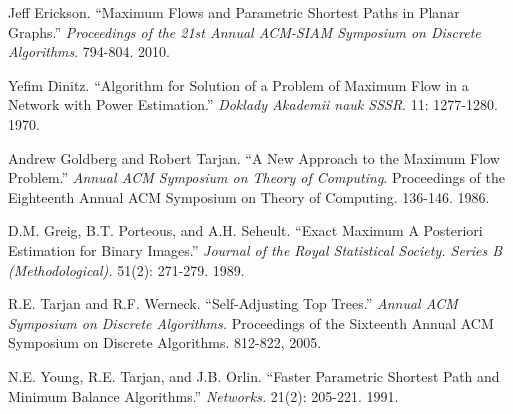 \documentclass[12pt]{article}
\begin{document}
\begin{thebibliography}{9}

        Jeff Erickson.
       ``Maximum Flows and Parametric Shortest Paths in Planar Graphs.''
       \emph{Proceedings of the 21st Annual ACM-SIAM Symposium on Discrete Algorithms}.
       794-804.
       2010.

        Yefim Dinitz.
        ``Algorithm for Solution of a Problem of Maximum Flow in a Network with Power Estimation.''
        \emph{Doklady Akademii nauk SSSR}.
        11: 1277-1280.
        1970.

        Andrew Goldberg and Robert Tarjan.
        ``A New Approach to the Maximum Flow Problem.''
        \emph{Annual ACM Symposium on Theory of Computing}.
        Proceedings of the Eighteenth Annual ACM Symposium on Theory of Computing.
        136-146.
        1986.

        D.M. Greig, B.T. Porteous, and A.H. Seheult.
        ``Exact Maximum A Posteriori Estimation for Binary Images.''
        \emph{Journal of the Royal Statistical Society. Series B (Methodological).}
        51(2): 271-279.
        1989.

        R.E. Tarjan and R.F. Werneck.
        ``Self-Adjusting Top Trees.''
        \emph{Annual ACM Symposium on Discrete Algorithms.}
        Proceedings of the Sixteenth Annual ACM Symposium on Discrete Algorithms.
        812-822,
        2005.

        N.E. Young, R.E. Tarjan, and J.B. Orlin. 
        ``Faster Parametric Shortest Path and Minimum Balance Algorithms.''
        \emph{Networks.}
        21(2): 205-221.
        1991.

\end{thebibliography}
\end{document}
